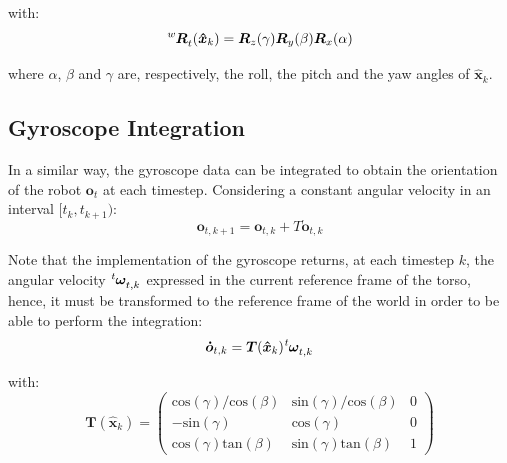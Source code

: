 \documentclass[a4paper]{article}
\begin{document}
\noindent with:
\begin{equation}
    \tensor[^w]{\bm{R}}{_t}(\bm{\hat{x}}_{k}) = \bm{R}_z(\gamma) \bm{R}_y(\beta) \bm{R}_x(\alpha)
\end{equation}

\noindent where $\alpha$, $\beta$ and $\gamma$ are, respectively,
the roll, the pitch and the yaw angles of $\bm{\hat{x}}_{k}$.

\subsection{Gyroscope Integration}
\label{subsec:gyro-integration}
In a similar way, the gyroscope data can be integrated to obtain the
orientation of the robot $\bm{o}_t$ at each timestep. Considering a constant angular
velocity in an interval $[t_k, t_{k+1})$:
\begin{equation}
    \label{eq:orientation-gyro-integration}
    \bm{o}_{t,k+1} = \bm{o}_{t,k} + T \bm{\dot{o}}_{t,k}
\end{equation}


Note that the implementation of the gyroscope returns, at each
timestep $k$, the angular velocity
$\tensor[^t]{\bm{\omega}}{_{t,k}}$ expressed in the current
reference frame of the torso, hence, it must be transformed to
the reference frame of the world in order to be able to perform the
integration:
\begin{equation}
    \bm{\dot{o}}_{t,k} = \bm{T}(\bm{\hat{x}}_{k}) \tensor[^t]{\bm{\omega}}{_{t,k}}
\end{equation}

\noindent with:
\begin{equation}
    \bm{T}(\bm{\hat{x}}_{k}) =
    \begin{pmatrix}
        \text{cos}(\gamma)/\text{cos}(\beta) & \text{sin}(\gamma)/\text{cos}(\beta) & 0 \\
        -\text{sin}(\gamma) &  \text{cos}(\gamma) & 0 \\
        \text{cos}(\gamma) \text{tan}(\beta) & \text{sin}(\gamma) \text{tan}(\beta) & 1
    \end{pmatrix}
\end{equation}

\end{document}
